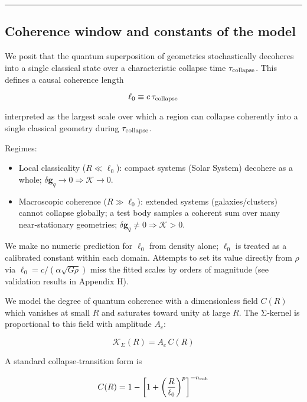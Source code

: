 \documentclass[11pt,a4paper]{article}
\begin{document}
\medskip\hrule\medskip


\subsection{Coherence window and constants of the model}


We posit that the quantum superposition of geometries stochastically decoheres into a single classical state over a characteristic collapse time $\tau_{\rm collapse}$. This defines a causal coherence length


\begin{equation}
\ell_0 \equiv c\,\tau_{\rm collapse}
\end{equation}


interpreted as the largest scale over which a region can collapse coherently into a single classical geometry during $\tau_{\rm collapse}$.


Regimes:

\begin{itemize}
\item Local classicality ($R\ll\ell_0$): compact systems (Solar System) decohere as a whole; $\delta\mathbf{g}_q\to0\Rightarrow \mathcal{K}\to0$.
\item Macroscopic coherence ($R\gg\ell_0$): extended systems (galaxies/clusters) cannot collapse globally; a test body samples a coherent sum over many near‑stationary geometries; $\delta\mathbf{g}_q\ne0\Rightarrow \mathcal{K}>0$.
\end{itemize}


We make no numeric prediction for $\ell_0$ from density alone; $\ell_0$ is treated as a calibrated constant within each domain. Attempts to set its value directly from $\rho$ via $\ell_0 = c/(\alpha\sqrt{G\rho})$ miss the fitted scales by orders of magnitude (see validation results in Appendix H).


We model the degree of quantum coherence with a dimensionless field $C(R)$ which vanishes at small $R$ and saturates toward unity at large $R$. The Σ‑kernel is proportional to this field with amplitude $A_c$:


\begin{equation}
\mathcal{K}_\Sigma(R) = A_c\,C(R)
\end{equation}


A standard collapse‑transition form is


\begin{equation}
C(R) = 1 - \left[1 + \left(\frac{R}{\ell_0}\right)^p\right]^{-n_{\rm coh}}
\end{equation}
\end{document}

